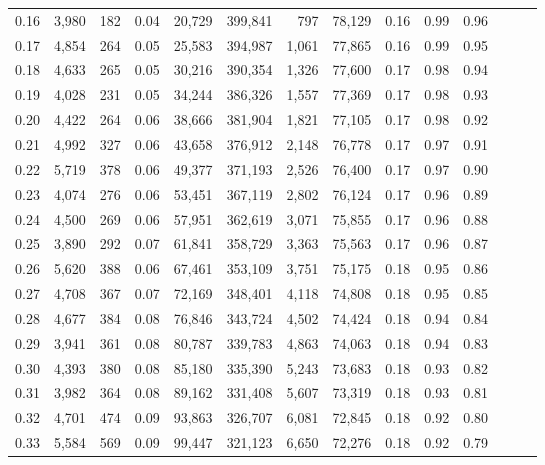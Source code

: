 \begin{tabular}{rrrrrrrrrrrrrr}
0.16 &   3,980 &    182 &  0.04 &   20,729 &  399,841 &     797 &  78,129 &  0.16 &  0.99 &      0.96 \\
0.17 &   4,854 &    264 &  0.05 &   25,583 &  394,987 &   1,061 &  77,865 &  0.16 &  0.99 &      0.95 \\
0.18 &   4,633 &    265 &  0.05 &   30,216 &  390,354 &   1,326 &  77,600 &  0.17 &  0.98 &      0.94 \\
0.19 &   4,028 &    231 &  0.05 &   34,244 &  386,326 &   1,557 &  77,369 &  0.17 &  0.98 &      0.93 \\
0.20 &   4,422 &    264 &  0.06 &   38,666 &  381,904 &   1,821 &  77,105 &  0.17 &  0.98 &      0.92 \\
0.21 &   4,992 &    327 &  0.06 &   43,658 &  376,912 &   2,148 &  76,778 &  0.17 &  0.97 &      0.91 \\
0.22 &   5,719 &    378 &  0.06 &   49,377 &  371,193 &   2,526 &  76,400 &  0.17 &  0.97 &      0.90 \\
0.23 &   4,074 &    276 &  0.06 &   53,451 &  367,119 &   2,802 &  76,124 &  0.17 &  0.96 &      0.89 \\
0.24 &   4,500 &    269 &  0.06 &   57,951 &  362,619 &   3,071 &  75,855 &  0.17 &  0.96 &      0.88 \\
0.25 &   3,890 &    292 &  0.07 &   61,841 &  358,729 &   3,363 &  75,563 &  0.17 &  0.96 &      0.87 \\
0.26 &   5,620 &    388 &  0.06 &   67,461 &  353,109 &   3,751 &  75,175 &  0.18 &  0.95 &      0.86 \\
0.27 &   4,708 &    367 &  0.07 &   72,169 &  348,401 &   4,118 &  74,808 &  0.18 &  0.95 &      0.85 \\
0.28 &   4,677 &    384 &  0.08 &   76,846 &  343,724 &   4,502 &  74,424 &  0.18 &  0.94 &      0.84 \\
0.29 &   3,941 &    361 &  0.08 &   80,787 &  339,783 &   4,863 &  74,063 &  0.18 &  0.94 &      0.83 \\
0.30 &   4,393 &    380 &  0.08 &   85,180 &  335,390 &   5,243 &  73,683 &  0.18 &  0.93 &      0.82 \\
0.31 &   3,982 &    364 &  0.08 &   89,162 &  331,408 &   5,607 &  73,319 &  0.18 &  0.93 &      0.81 \\
0.32 &   4,701 &    474 &  0.09 &   93,863 &  326,707 &   6,081 &  72,845 &  0.18 &  0.92 &      0.80 \\
0.33 &   5,584 &    569 &  0.09 &   99,447 &  321,123 &   6,650 &  72,276 &  0.18 &  0.92 &      0.79 \\

\end{tabular}
